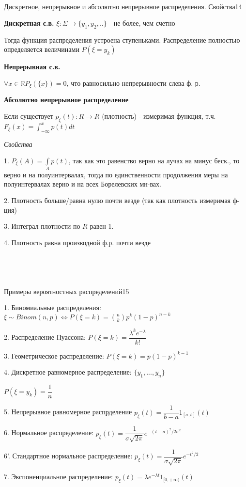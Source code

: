 \documentclass{article}
\begin{document}
~\

~\

\begin{question}{Дискретное, непрерывное и абсолютно непрерывное распределения. Свойства}{14}

\textbf{Дискретная с.в.} $\xi : \Sigma \rightarrow \{y_1, y_2, ..\}$ - не более, чем счетно

Тогда функция распределения устроена ступеньками. Распределение полностью определяется величинами $P(\xi = y_k)$

\textbf{Непрерывная с.в.}

$\forall x \in \mathbb{R} P_\xi(\{x \}) = 0$, что равносильно непрерывности слева ф. р.

\textbf{Абсолютно непрерывное распределение}

Если существует $p_\xi(t) : R \rightarrow R$ (плотность) - измеримая функция, т.ч. $F_\xi(x) = \int_{-\infty}^x{p(t) dt}$

\textit{Свойства}

1. $P_\xi (A) = \int\limits_A{p(t)}$, так как это равенство верно на лучах на минус беск., то верно и на полуинтервалах, тогда по единственности продолжения меры на полуинтервалах верно и на всех Борелевских мн-вах.

2. Плотность больше/равна нулю почти везде (так как плотность измеримая ф-ция)

3. Интеграл плотности по $R$ равен 1.

4. Плотность равна производной ф.р. почти везде

\end{question}

~\

~\

\begin{question}{Примеры вероятностных распределений}{15}

1. Биномиальные распределения: $\xi \sim Binom(n, p) \Leftrightarrow P(\xi = k) = {n \choose k} p^k (1 - p)^{n - k}$

2. Распределение Пуассона: $P(\xi = k) = \dfrac{\lambda^k e^{-\lambda}}{k!}$

3. Геометрическое распределение: $P(\xi = k) = p(1 - p)^{k - 1}$

4. Дискретное равномерное распределение: $\{y_1, ..., y_n \}$

$P(\xi = y_k) = \dfrac{1}{n}$

5. Непрерывное равномерное распрделение $p_\xi(t) = \dfrac{1}{b - a} 1_{[a, b]}(t)$

6. Нормальное распределение: $p_\xi(t) = \dfrac{1}{\sigma \sqrt{2\pi}}e^{-(t-a)^2/2 \sigma^2}$

6'. Стандартное нормальное распределение: $p_\xi(t) = \dfrac{1}{\sigma \sqrt{2\pi}}e^{-t^2/2}$

7. Экспоненциальное распределение: $p_\xi(t) = \lambda e^{-\lambda t} 1_{[0, + \infty)}(t)$

\end{question}
\end{document}
